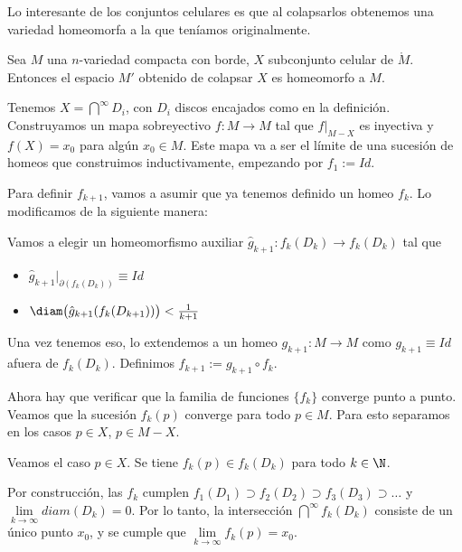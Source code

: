Lo interesante de los conjuntos celulares es que al colapsarlos obtenemos una variedad homeomorfa a la que teníamos originalmente.

\begin{lema}
    Sea $M$ una $n$-variedad compacta con borde, $X$ subconjunto celular de $\mathring{M}$. Entonces el espacio $M'$ obtenido de colapsar $X$ es homeomorfo a $M$.
\end{lema}

\begin{dem}
    Tenemos $X=\bigcap\limits^{\infty} D_i$, con $D_i$ discos encajados como en la definición. Construyamos un mapa sobreyectivo $f:M\to M$ tal que $f|_{M-X}$ es inyectiva y $f(X)=x_0$ para algún $x_0\in M$. Este mapa va a ser el límite de una sucesión de homeos que construimos inductivamente, empezando por $f_1:= Id$.

    Para definir $f_{k+1}$, vamos a asumir que ya tenemos definido un homeo $f_k$. Lo modificamos de la siguiente manera:

    Vamos a elegir un homeomorfismo auxiliar $\hat{g}_{k+1}:f_k(D_k)\to f_k(D_k)$ tal que 
    
    \begin{itemize}
        \item $\hat{g}_{k+1}|_{\partial(f_k(D_k))}\equiv Id$
        \item $\diam\big(\hat{g}_{k+1}(f_k(D_{k+1}))\big)<\frac{1}{k+1}$
    \end{itemize}
    
    Una vez tenemos eso, lo extendemos a un homeo $g_{k+1}:M\to M$ como $g_{k+1}\equiv Id$ afuera de $f_k(D_k)$. Definimos $f_{k+1}:= g_{k+1}\circ f_k$.
    


    Ahora hay que verificar que la familia de funciones $\{f_k\}$ converge punto a punto. Veamos que la sucesión $f_k(p)$ converge para todo $p\in M$. Para esto separamos en los casos $p\in X$, $p\in M-X$.

    Veamos el caso $p\in X$. Se tiene $f_k(p)\in f_k(D_k)$ para todo $k\in\N$.

    Por construcción, las $f_k$ cumplen $f_1(D_1)\supset f_2(D_2)\supset f_3(D_3)\supset\dots$ y $\lim\limits_{k\to\infty}diam(D_k)=0$. Por lo tanto, la intersección $\bigcap\limits^\infty f_k(D_k)$ consiste de un único punto $x_0$, y se cumple que $\lim\limits_{k\to\infty}f_k(p)=x_0$.


\end{dem}
